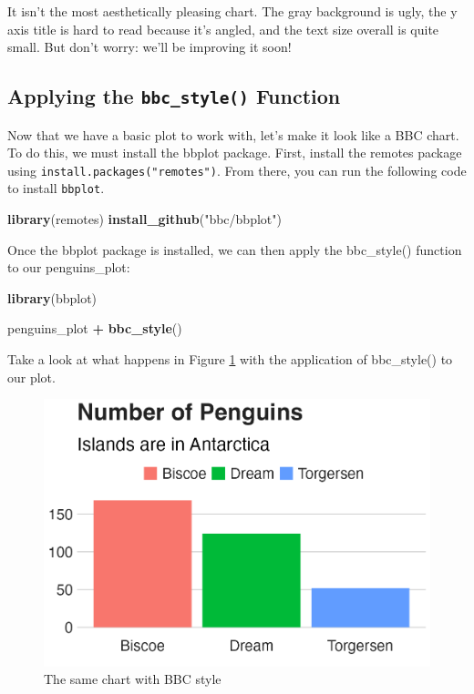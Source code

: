 \documentclass[
]{book}
\newenvironment{Shaded}{\begin{snugshade}}{\end{snugshade}}
\newcommand{\FunctionTok}[1]{\textcolor[rgb]{0.13,0.29,0.53}{\textbf{#1}}}
\newcommand{\NormalTok}[1]{#1}
\newcommand{\SpecialCharTok}[1]{\textcolor[rgb]{0.81,0.36,0.00}{\textbf{#1}}}
\newcommand{\StringTok}[1]{\textcolor[rgb]{0.31,0.60,0.02}{#1}}
\begin{document}
It isn't the most aesthetically pleasing chart. The gray background is ugly, the y axis title is hard to read because it's angled, and the text size overall is quite small. But don't worry: we'll be improving it soon!

\hypertarget{applying-the-bbc_style-function}{%
\subsection*{\texorpdfstring{Applying the \texttt{bbc\_style()} Function}{Applying the bbc\_style() Function}}\label{applying-the-bbc_style-function}}

Now that we have a basic plot to work with, let's make it look like a BBC chart. To do this, we must install the bbplot package. First, install the remotes package using \texttt{install.packages("remotes")}. From there, you can run the following code to install \texttt{bbplot}.

\begin{Shaded}
\begin{Highlighting}[]
\FunctionTok{library}\NormalTok{(remotes)}
\FunctionTok{install\_github}\NormalTok{(}\StringTok{"bbc/bbplot"}\NormalTok{)}
\end{Highlighting}
\end{Shaded}

Once the bbplot package is installed, we can then apply the bbc\_style() function to our penguins\_plot:

\begin{Shaded}
\begin{Highlighting}[]
\FunctionTok{library}\NormalTok{(bbplot)}

\NormalTok{penguins\_plot }\SpecialCharTok{+}
  \FunctionTok{bbc\_style}\NormalTok{()}
\end{Highlighting}
\end{Shaded}

Take a look at what happens in Figure \ref{fig:penguins-bbc-style-plot} with the application of bbc\_style() to our plot.

\begin{figure}
\includegraphics[width=1\linewidth]{custom-theme_files/figure-latex/penguins-bbc-style-plot-1} \caption{The same chart with BBC style}\label{fig:penguins-bbc-style-plot}
\end{figure}
\end{document}
